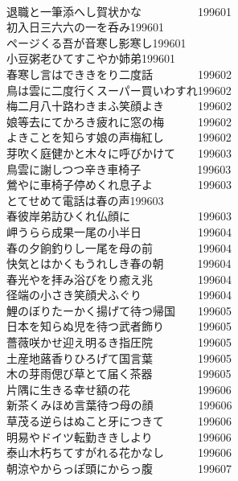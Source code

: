 \begin{multicols}{2}
\\退職と一筆添へし賀状かな　　　　　\hfill{199601}
\\初入日三六六の一を呑み\hfill{199601}
\\ページくる吾が音寒し影寒し\hfill{199601}
\\小豆粥老ひてすこやか姉弟\hfill{199601}
\\春寒し言はでききをり二度話　　　　\hfill{199602}
\\鳥は雲に二度行くスーパー買いわすれ\hfill{199602}
\\梅二月八十路わきまふ笑顔よき　　　\hfill{199602}
\\娘等去にてかろき疲れに窓の梅　　　\hfill{199602}
\\よきことを知らす娘の声梅紅し　　　\hfill{199602}
\\芽吹く庭健かと木々に呼びかけて　　\hfill{199603}
\\鳥雲に謝しつつ辛き車椅子　　　　　\hfill{199603}
\\鶯やに車椅子停めくれ息子よ　　　　\hfill{199603}
\\とてせめて電話は春の声\hfill{199603}
\\春彼岸弟訪ひくれ仏顔に　　　　　　\hfill{199603}
\\岬うらら成果一尾の小半日　　　　　\hfill{199604}
\\春の夕餉釣りし一尾を母の前　　　　\hfill{199604}
\\快気とはかくもうれしき春の朝　　　\hfill{199604}
\\春光やを拝み浴びをり癒え兆　　　　\hfill{199604}
\\径端の小さき笑顔犬ふぐり　　　　　\hfill{199604}
\\鯉のぼりたーかく揚げて待つ帰国　　\hfill{199605}
\\日本を知らぬ児を待つ武者飾り　　　\hfill{199605}
\\薔薇咲かせ迎え明るき指圧院　　　　\hfill{199605}
\\土産地蕗香りひろげて国言葉　　　　\hfill{199605}
\\木の芽雨偲び草とて届く茶器　　　　\hfill{199605}
\\片隅に生きる幸せ額の花　　　　　　\hfill{199606}
\\新茶くみほめ言葉待つ母の顔　　　　\hfill{199606}
\\草茂る逆らはぬこと牙につきて　　　\hfill{199606}
\\明易やドイツ転勤ききしより　　　　\hfill{199606}
\\泰山木朽ちてすがれる花かなし　　　\hfill{199606}
\\朝涼やからっぽ頭にからっ腹　　　　\hfill{199607}

\end{multicols}
